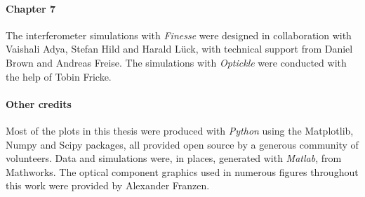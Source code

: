 \paragraph{Chapter 7}
The interferometer simulations with \emph{Finesse} were designed in collaboration with Vaishali Adya, Stefan Hild and Harald L\"{u}ck, with technical support from Daniel Brown and Andreas Freise. The simulations with \emph{Optickle} were conducted with the help of Tobin Fricke.

\paragraph{Other credits}
Most of the plots in this thesis were produced with \emph{Python} using the Matplotlib, Numpy and Scipy packages, all provided open source by a generous community of volunteers. Data and simulations were, in places, generated with \emph{Matlab}, from Mathworks. The optical component graphics used in numerous figures throughout this work were provided by Alexander Franzen.